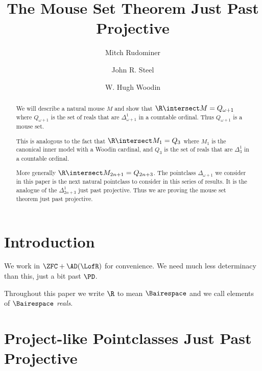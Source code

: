 \documentclass[oneside,12pt]{amsart}
\begin{document}
\title{The Mouse Set Theorem Just Past Projective}
\author{Mitch Rudominer}
\author{John R. Steel}
\author{W. Hugh Woodin}



\begin{abstract}
We will describe a natural mouse $M$ and show that $\R\intersect M = Q_{\omega+1}$
where $Q_{\omega+1}$  is the set of reals that are
$\Delta^1_{\omega+1}$ in a countable ordinal. Thus $Q_{\omega+1}$
is a mouse set.

This is analogous to the fact that $\R\intersect M_1 = Q_3$ where $M_1$ is the
canonical inner model with a Woodin cardinal, and $Q_3$ is the set of reals
that are $\Delta^1_3$ in a countable ordinal.

More generally $\R\intersect M_{2n+1} = Q_{2n+3}$.
The pointclass $\Delta_{\omega+1}$  we consider in this paper is the next natural
pointclass to consider in this series of results. It is the analogue of
the $\Delta^1_{2n+3}$ just past projective. Thus we are proving the mouse
set theorem just past projective.
\end{abstract}

\maketitle

\tableofcontents

\section{Introduction}
\label{section:intro}

We work in $\ZFC+\AD(\LofR)$ for convenience. We need much less determinacy
than this, just a bit past $\PD$.

Throughout this paper we write $\R$ to mean $\Bairespace$ and we call elements of $\Bairespace$ \emph{reals}.

\section{Project-like Pointclasses Just Past Projective}
\label{section:projectlikepointclasses}
\end{document}
